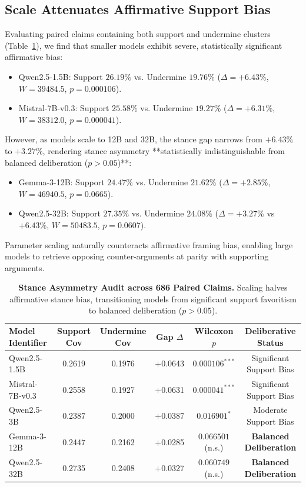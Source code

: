 \documentclass[11pt,a4paper]{article}
\begin{document}
\subsection{Scale Attenuates Affirmative Support Bias}
Evaluating paired claims containing both support and undermine clusters (Table~\ref{tab:stance_asymmetry}), we find that smaller models exhibit severe, statistically significant affirmative bias:
\begin{itemize}
    \item Qwen2.5-1.5B: Support $26.19\%$ vs. Undermine $19.76\%$ ($\Delta = +6.43\%$, $W = 39484.5$, $p = 0.000106$).
    \item Mistral-7B-v0.3: Support $25.58\%$ vs. Undermine $19.27\%$ ($\Delta = +6.31\%$, $W = 38312.0$, $p = 0.000041$).
\end{itemize}
However, as models scale to 12B and 32B, the stance gap narrows from $+6.43\%$ to $+3.27\%$, rendering stance asymmetry **statistically indistinguishable from balanced deliberation ($p > 0.05$)**:
\begin{itemize}
    \item Gemma-3-12B: Support $24.47\%$ vs. Undermine $21.62\%$ ($\Delta = +2.85\%$, $W = 46940.5$, $p = 0.0665$).
    \item Qwen2.5-32B: Support $27.35\%$ vs. Undermine $24.08\%$ ($\Delta = +3.27\%$ vs $+6.43\%$, $W = 50483.5$, $p = 0.0607$).
\end{itemize}
Parameter scaling naturally counteracts affirmative framing bias, enabling large models to retrieve opposing counter-arguments at parity with supporting arguments.

\begin{table}[t]
\centering
\small
\begin{tabular}{lccccc}
\toprule
\textbf{Model Identifier} & \textbf{Support Cov} & \textbf{Undermine Cov} & \textbf{Gap $\Delta$} & \textbf{Wilcoxon $p$} & \textbf{Deliberative Status} \\
\midrule
Qwen2.5-1.5B & 0.2619 & 0.1976 & +0.0643 & $0.000106^{***}$ & Significant Support Bias \\
Mistral-7B-v0.3 & 0.2558 & 0.1927 & +0.0631 & $0.000041^{***}$ & Significant Support Bias \\
Qwen2.5-3B & 0.2387 & 0.2000 & +0.0387 & $0.016901^{*}$ & Moderate Support Bias \\
Gemma-3-12B & 0.2447 & 0.2162 & +0.0285 & $0.066501$ (n.s.) & \textbf{Balanced Deliberation} \\
Qwen2.5-32B & 0.2735 & 0.2408 & +0.0327 & $0.060749$ (n.s.) & \textbf{Balanced Deliberation} \\
\bottomrule
\end{tabular}
\caption{\textbf{Stance Asymmetry Audit across 686 Paired Claims.} Scaling halves affirmative stance bias, transitioning models from significant support favoritism to balanced deliberation ($p > 0.05$).}
\label{tab:stance_asymmetry}
\end{table}
\end{document}
